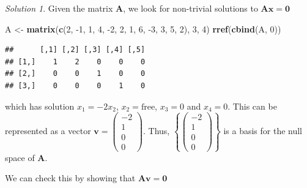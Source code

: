 \documentclass[
]{book}
\newenvironment{Shaded}{\begin{snugshade}}{\end{snugshade}}
\newcommand{\DecValTok}[1]{\textcolor[rgb]{0.00,0.00,0.81}{#1}}
\newcommand{\KeywordTok}[1]{\textcolor[rgb]{0.13,0.29,0.53}{\textbf{#1}}}
\newcommand{\NormalTok}[1]{#1}
\newcommand{\OperatorTok}[1]{\textcolor[rgb]{0.81,0.36,0.00}{\textbf{#1}}}
\newcommand{\StringTok}[1]{\textcolor[rgb]{0.31,0.60,0.02}{#1}}
\theoremstyle{definition}
\theoremstyle{definition}
\theoremstyle{definition}
\theoremstyle{remark}
\newtheorem*{solution}{Solution}
\begin{document}
\begin{solution}

Given the matrix \(\mathbf{A}\), we look for non-trivial solutions to \(\mathbf{A} \mathbf{x} = \mathbf{0}\)

\begin{Shaded}
\begin{Highlighting}[]
\NormalTok{A <-}\StringTok{ }\KeywordTok{matrix}\NormalTok{(}\KeywordTok{c}\NormalTok{(}\DecValTok{2}\NormalTok{, }\DecValTok{-1}\NormalTok{, }\DecValTok{1}\NormalTok{, }\DecValTok{4}\NormalTok{, }\DecValTok{-2}\NormalTok{, }\DecValTok{2}\NormalTok{, }\DecValTok{1}\NormalTok{, }\DecValTok{6}\NormalTok{, }\DecValTok{-3}\NormalTok{, }\DecValTok{3}\NormalTok{, }\DecValTok{5}\NormalTok{, }\DecValTok{2}\NormalTok{), }\DecValTok{3}\NormalTok{, }\DecValTok{4}\NormalTok{)}
\KeywordTok{rref}\NormalTok{(}\KeywordTok{cbind}\NormalTok{(A, }\DecValTok{0}\NormalTok{))}
\end{Highlighting}
\end{Shaded}

\begin{verbatim}
##      [,1] [,2] [,3] [,4] [,5]
## [1,]    1    2    0    0    0
## [2,]    0    0    1    0    0
## [3,]    0    0    0    1    0
\end{verbatim}

which has solution \(x_1 = -2 x_2\), \(x_2 = \mbox{free}\), \(x_3 = 0\) and \(x_4 = 0\). This can be represented as a vector \(\mathbf{v} = \begin{pmatrix} -2 \\ 1 \\ 0 \\ 0 \end{pmatrix}\). Thus, \(\left\{ \begin{pmatrix} -2 \\ 1 \\ 0 \\ 0 \end{pmatrix} \right\}\) is a basis for the null space of \(\mathbf{A}\).

We can check this by showing that \(\mathbf{A} \mathbf{v} = \mathbf{0}\)

\begin{Shaded}
\end{Shaded}


\end{solution}
\end{document}
